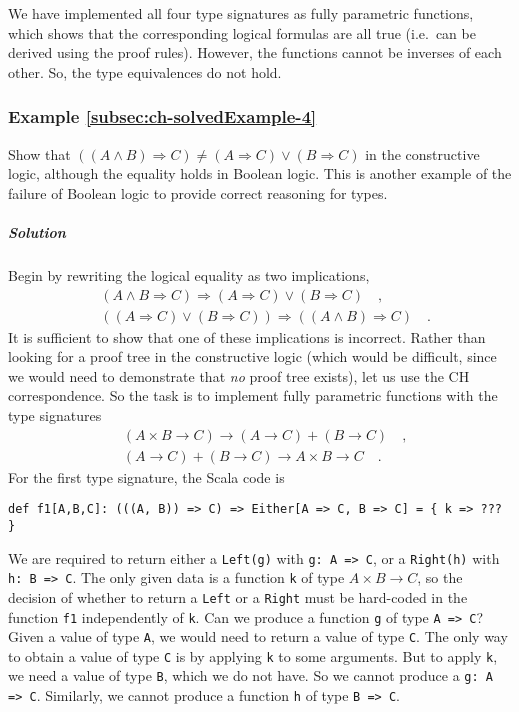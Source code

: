 We have implemented all four type signatures as fully parametric functions,
which shows that the corresponding logical formulas are all true (i.e.~can
be derived using the proof rules). However, the functions cannot be
inverses of each other. So, the type equivalences do not hold.

\subsubsection{Example \label{subsec:ch-solvedExample-4}\ref{subsec:ch-solvedExample-4}}

Show that $\left(\left(A\wedge B\right)\Rightarrow C\right)\neq(A\Rightarrow C)\vee(B\Rightarrow C)$
in the constructive logic, although the equality holds in Boolean
logic. This is another example of the failure of Boolean logic to
provide correct reasoning for types.

\subparagraph{Solution}

Begin by rewriting the logical equality as two implications,
\begin{align*}
 & (A\wedge B\Rightarrow C)\Rightarrow(A\Rightarrow C)\vee(B\Rightarrow C)\quad,\\
 & \left((A\Rightarrow C)\vee(B\Rightarrow C)\right)\Rightarrow\left(\left(A\wedge B\right)\Rightarrow C\right)\quad.
\end{align*}
It is sufficient to show that one of these implications is incorrect.
Rather than looking for a proof tree in the constructive logic (which
would be difficult, since we would need to demonstrate that \emph{no}
proof tree exists), let us use the CH correspondence. So the task
is to implement fully parametric functions with the type signatures
\begin{align*}
 & (A\times B\rightarrow C)\rightarrow(A\rightarrow C)+(B\rightarrow C)\quad,\\
 & (A\rightarrow C)+(B\rightarrow C)\rightarrow A\times B\rightarrow C\quad.
\end{align*}
For the first type signature, the Scala code is
\begin{lstlisting}
def f1[A,B,C]: (((A, B)) => C) => Either[A => C, B => C] = { k => ??? }
\end{lstlisting}
We are required to return either a \lstinline!Left(g)! with \lstinline!g: A => C!,
or a \lstinline!Right(h)! with \lstinline!h: B => C!. The only given
data is a function \lstinline!k! of type $A\times B\rightarrow C$,
so the decision of whether to return a \lstinline!Left! or a \lstinline!Right!
must be hard-coded in the function \lstinline!f1! independently of
\lstinline!k!. Can we produce a function \lstinline!g! of type \lstinline!A => C!?
Given a value of type \lstinline!A!, we would need to return a value
of type \lstinline!C!. The only way to obtain a value of type \lstinline!C!
is by applying \lstinline!k! to some arguments. But to apply \lstinline!k!,
we need a value of type \lstinline!B!, which we do not have. So we
cannot produce a \lstinline!g: A => C!. Similarly, we cannot produce
a function \lstinline!h! of type \lstinline!B => C!.


